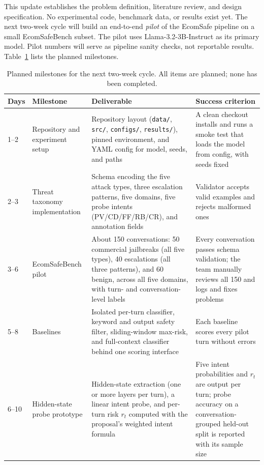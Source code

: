 \documentclass[sigconf,nonacm]{acmart}
\begin{document}
This update establishes the problem definition, literature review, and design specification. No experimental code, benchmark data, or results exist yet. The next two-week cycle will build an end-to-end \emph{pilot} of the EcomSafe pipeline on a small EcomSafeBench subset. The pilot uses Llama-3.2-3B-Instruct as its primary model. Pilot numbers will serve as pipeline sanity checks, not reportable results. Table~\ref{tab:plan} lists the planned milestones.

\begin{table}[t]
  \caption{Planned milestones for the next two-week cycle. All items are planned; none has been completed.}
  \label{tab:plan}
  \small
  \begin{tabular}{p{0.8cm}p{2.4cm}p{6.0cm}p{6.0cm}}
    \toprule
    \textbf{Days} & \textbf{Milestone} & \textbf{Deliverable} & \textbf{Success criterion} \\
    \midrule
    1--2 & Repository and experiment setup & Repository layout (\texttt{data/}, \texttt{src/}, \texttt{configs/}, \texttt{results/}), pinned environment, and YAML config for model, seeds, and paths & A clean checkout installs and runs a smoke test that loads the model from config, with seeds fixed \\
    2--3 & Threat taxonomy implementation & Schema encoding the five attack types, three escalation patterns, five domains, five probe intents (PV/CD/FF/RB/CR), and annotation fields & Validator accepts valid examples and rejects malformed ones \\
    3--6 & EcomSafeBench pilot & About 150 conversations: 50 commercial jailbreaks (all five types), 40 escalations (all three patterns), and 60 benign, across all five domains, with turn- and conversation-level labels & Every conversation passes schema validation; the team manually reviews all 150 and logs and fixes problems \\
    5--8 & Baselines & Isolated per-turn classifier, keyword and output safety filter, sliding-window max-risk, and full-context classifier behind one scoring interface & Each baseline scores every pilot turn without errors \\
    6--10 & Hidden-state probe prototype & Hidden-state extraction (one or more layers per turn), a linear intent probe, and per-turn risk $r_t$ computed with the proposal's weighted intent formula & Five intent probabilities and $r_t$ are output per turn; probe accuracy on a conversation-grouped held-out split is reported with its sample size \\

\end{tabular}
\end{table}
\end{document}

